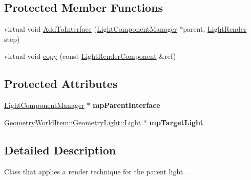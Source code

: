 \subsection*{Protected Member Functions}
\begin{DoxyCompactItemize}
\item 
virtual void \mbox{\hyperlink{class_geometry_engine_1_1_light_utils_1_1_light_render_component_af6701af8d0d34f987852ab0faebefa86}{Add\+To\+Interface}} (\mbox{\hyperlink{class_geometry_engine_1_1_light_utils_1_1_light_component_manager}{Light\+Component\+Manager}} $\ast$parent, \mbox{\hyperlink{namespace_geometry_engine_1_1_light_utils_ac3078de660742daceaa06bd9bc61d24a}{Light\+Render}} step)
\item 
virtual void \mbox{\hyperlink{class_geometry_engine_1_1_light_utils_1_1_light_render_component_a3a08d64bbf4aef1300b334dd0b21ed62}{copy}} (const \mbox{\hyperlink{class_geometry_engine_1_1_light_utils_1_1_light_render_component}{Light\+Render\+Component}} \&ref)
\end{DoxyCompactItemize}
\subsection*{Protected Attributes}
\begin{DoxyCompactItemize}
\item 
\mbox{\label{class_geometry_engine_1_1_light_utils_1_1_light_render_component_abdcf3fc1704784f213360da22a9c729d}} 
\mbox{\hyperlink{class_geometry_engine_1_1_light_utils_1_1_light_component_manager}{Light\+Component\+Manager}} $\ast$ {\bfseries mp\+Parent\+Interface}
\item 
\mbox{\label{class_geometry_engine_1_1_light_utils_1_1_light_render_component_adcc4f1c87114562bdc31a1bb9b5f964c}} 
\mbox{\hyperlink{class_geometry_engine_1_1_geometry_world_item_1_1_geometry_light_1_1_light}{Geometry\+World\+Item\+::\+Geometry\+Light\+::\+Light}} $\ast$ {\bfseries mp\+Target\+Light}
\end{DoxyCompactItemize}


\subsection{Detailed Description}
Class that applies a render technique for the parent light. 

